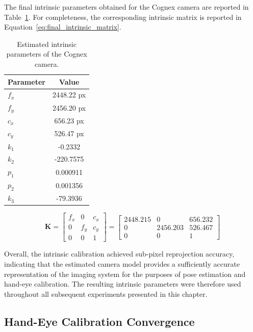 The final intrinsic parameters obtained for the Cognex camera are reported in Table~\ref{tab:intrinsic_parameters}. For completeness, the corresponding intrinsic matrix is reported in Equation~\eqref{eq:final_intrinsic_matrix}.

\begin{table}[htbp]
	\centering
	\caption{Estimated intrinsic parameters of the Cognex camera.}
	\label{tab:intrinsic_parameters}
	\begin{tabular}{lc}
		\toprule
		Parameter & Value \\
		\midrule
		$f_x$ & 2448.22 px \\
		$f_y$ & 2456.20 px \\
		$c_x$ & 656.23 px \\
		$c_y$ & 526.47 px \\
		$k_1$ & -0.2332 \\
		$k_2$ & -220.7575 \\
		$p_1$ & 0.000911 \\
		$p_2$ & 0.001356 \\
		$k_3$ & -79.3936 \\
		\bottomrule
	\end{tabular}
\end{table}

\begin{equation}
	\mathbf{K}
	=
	\begin{bmatrix}
		f_x & 0 & c_x \\
		0 & f_y & c_y \\
		0 & 0 & 1
	\end{bmatrix}
	=
	\begin{bmatrix}
		2448.215 & 0 & 656.232 \\
		0 & 2456.203 & 526.467 \\
		0 & 0 & 1
	\end{bmatrix}
	\label{eq:final_intrinsic_matrix}
\end{equation}

Overall, the intrinsic calibration achieved sub-pixel reprojection accuracy, indicating that the estimated camera model provides a sufficiently accurate representation of the imaging system for the purposes of pose estimation and hand-eye calibration. The resulting intrinsic parameters were therefore used throughout all subsequent experiments presented in this chapter.







\subsection{Hand-Eye Calibration Convergence}
\label{subsec}

